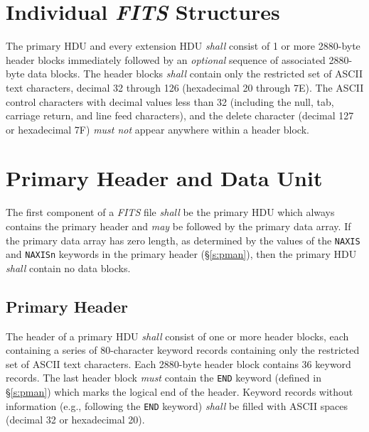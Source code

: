 \documentclass[11pt,makeidx]{book}     %
\begin{document}
  \section {Individual {\em FITS\/} Structures} 
   The primary HDU and every
   extension  HDU {\em shall} consist
   of 1 or more 2880-byte header blocks immediately followed by an {\em optional}
   sequence of associated 2880-byte data blocks. The header blocks {\em shall}
   contain only the restricted set of ASCII text characters,
   decimal 32 through 126 (hexadecimal 20 through 7E).  The ASCII control
   characters with decimal values less than 32 (including the null, tab,
   carriage return, and line feed characters), and the delete character
   (decimal 127 or hexadecimal 7F) {\em must not} appear anywhere within a header block.  

  \section{Primary Header and Data Unit}
   The first component of a {\em FITS\/} file {\em shall} be the 
   primary HDU which always contains the primary header and 
   {\em may} be followed by
   the primary data
   array. If the primary data array has zero length, as
   determined by the values of the {\tt NAXIS} 
   and {\tt NAXISn} keywords
   in the primary header (\S\ref{s:pman}), then the primary HDU
   {\em shall} contain no data blocks.
  
   \subsection{Primary Header} The header of a primary 
   HDU {\em shall} consist of  one or more header blocks, each
   containing a series of 80-character keyword 
   records containing only the restricted set of 
   ASCII
   text characters.  Each 2880-byte header  block contains 36 keyword
   records.  The last header block {\em must} contain the {\tt END} keyword
   (defined in \S\ref{s:pman}) which marks the logical end of the header. 
   Keyword records without information  (e.g., following the
   {\tt END}  keyword) {\em shall} be
   filled with ASCII spaces (decimal 32 or hexadecimal 20).
\end{document}
